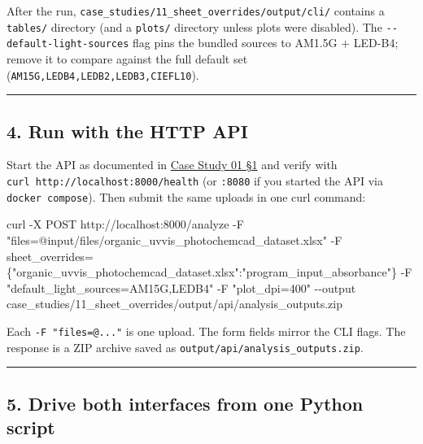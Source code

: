 \documentclass[
  11pt,
]{article}
\newenvironment{Shaded}{}{}
\newcommand{\AttributeTok}[1]{\textcolor[rgb]{0.49,0.56,0.16}{#1}}
\newcommand{\ExtensionTok}[1]{#1}
\newcommand{\NormalTok}[1]{#1}
\newcommand{\StringTok}[1]{\textcolor[rgb]{0.25,0.44,0.63}{#1}}
\begin{document}
After the run, \texttt{case\_studies/11\_sheet\_overrides/output/cli/}
contains a \texttt{tables/} directory (and a \texttt{plots/} directory
unless plots were disabled). The \texttt{-\/-default-light-sources} flag
pins the bundled sources to AM1.5G + LED-B4; remove it to compare
against the full default set (\texttt{AM15G,LEDB4,LEDB2,LEDB3,CIEFL10}).

\begin{center}\rule{0.5\linewidth}{0.5pt}\end{center}

\hypertarget{4-run-with-the-http-api}{
\subsection{4. Run with the HTTP API}\label{4-run-with-the-http-api}}

Start the API as documented in
\href{https://github.com/pinarsyt/overlap-calculator/blob/main/case_studies/01_theoretical_only/README.md\#1-prerequisites}{Case
Study 01 §1} and verify with
\texttt{curl\ http://localhost:8000/health} (or \texttt{:8080} if you
started the API via \texttt{docker\ compose}). Then submit the same
uploads in one curl command:

\begin{Shaded}
\begin{Highlighting}[]
\ExtensionTok{curl} \AttributeTok{{-}X}\NormalTok{ POST http://localhost:8000/analyze }\AttributeTok{{-}F} \StringTok{"files=@input/files/organic\_uvvis\_photochemcad\_dataset.xlsx"} \AttributeTok{{-}F} \StringTok{\textquotesingle{}sheet\_overrides=\{"organic\_uvvis\_photochemcad\_dataset.xlsx":"program\_input\_absorbance"\}\textquotesingle{}} \AttributeTok{{-}F} \StringTok{"default\_light\_sources=AM15G,LEDB4"} \AttributeTok{{-}F} \StringTok{"plot\_dpi=400"} \AttributeTok{{-}{-}output}\NormalTok{ case\_studies/11\_sheet\_overrides/output/api/analysis\_outputs.zip}
\end{Highlighting}
\end{Shaded}

Each \texttt{-F\ "files=@..."} is one upload. The form fields mirror the
CLI flags. The response is a ZIP archive saved as
\texttt{output/api/analysis\_outputs.zip}.

\begin{center}\rule{0.5\linewidth}{0.5pt}\end{center}

\hypertarget{5-drive-both-interfaces-from-one-python-script}{
\subsection{5. Drive both interfaces from one Python
script}\label{5-drive-both-interfaces-from-one-python-script}}
\end{document}
